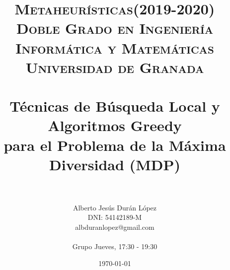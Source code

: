 

\usepackage{algpseudocode}
\usepackage[spanish]{babel}
\usepackage{varwidth}
\usepackage{hyperref}

\usepackage[spanish,onelanguage]{algorithm2e} %
\usepackage[lmargin=3.81cm,tmargin=2.54cm,rmargin=2.54cm,bmargin=2.52cm]{geometry}


\title{	
\normalfont \normalsize 
\textsc{\textbf{Metaheurísticas(2019-2020)} \\ Doble Grado en Ingeniería Informática y Matemáticas \\ Universidad de Granada} \\ [25pt] %
\horrule{0.5pt} \\[0.4cm] %
\huge Técnicas de Búsqueda Local y Algoritmos Greedy \\ para el Problema de la Máxima Diversidad  (MDP) \\ %
\horrule{2pt} \\[0.5cm] %
}
\author{Alberto Jesús Durán López \\ 
DNI: 54142189-M \\
albduranlopez@gmail.com \\
\hfill \break \hspace{1cm}\\
Grupo Jueves, 17:30 - 19:30 } %


\date{\normalsize\today} %




\maketitle %

\newpage %

\tableofcontents %


